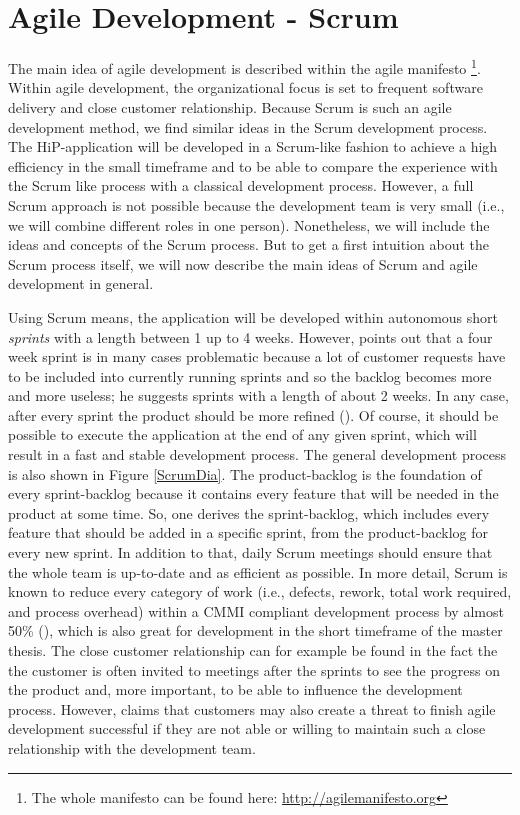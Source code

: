 \section{Agile Development - Scrum}
\label{SCRUM-intro}
The main idea of agile development is described within the agile manifesto \cite{Beck2001agile}\footnote{The whole manifesto can be found here: \url{http://agilemanifesto.org}}. Within agile development, the organizational focus is set to frequent software delivery and close customer relationship. Because Scrum is such an agile development method, we find similar ideas in the Scrum development process. The HiP-application will be developed in a Scrum-like fashion to achieve a high efficiency in the small timeframe and to be able to compare the experience with the Scrum like process with a classical development process. However, a full Scrum approach is not possible because the development team is very small (i.e.,  we will combine different roles in one person). Nonetheless, we will include the ideas and concepts of the Scrum process. But to get a first intuition about the Scrum process itself, we will now describe the main ideas of Scrum and agile development in general.

Using Scrum means, the application will be developed within autonomous short \textit{sprints} with a length between 1 up to 4 weeks. However, \cite{Ber07} points out that a four week sprint is in many cases problematic because a lot of customer requests have to be included into currently running sprints and so the backlog becomes more and more useless; he suggests sprints with a length of about 2 weeks. In any case, after every sprint the product should be more refined (\cite{scrum}). Of course, it should be possible to execute the application at the end of any given sprint, which will result in a fast and stable development process. The general development process is also shown in Figure \ref{ScrumDia}. The product-backlog is the foundation of every sprint-backlog because it contains every feature that will be needed in the product at some time. So, one derives the sprint-backlog, which includes every feature that should be added in a specific sprint, from the product-backlog for every new sprint. In addition to that, daily Scrum meetings should ensure that the whole team is up-to-date and as efficient as possible. In more detail, Scrum is known to reduce every category of work (i.e., defects, rework, total work required, and process overhead) within a \ac{CMMI} compliant development process by almost 50\% (\cite{Sut09}), which is also great for development in the short timeframe of the master thesis. The close customer relationship can for example be found in the fact the the customer is often invited to meetings after the sprints to see the progress on the product and, more important, to be able to influence the development process. However, \cite{paulk2002agile} claims that customers may also create a threat to finish agile development successful if they are not able or willing to maintain such a close relationship with the development team.

